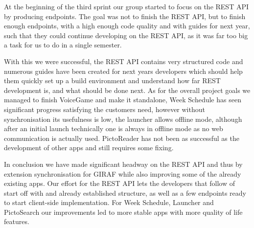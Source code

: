 \bigskip \noindent
At the beginning of the third sprint our group started to focus on the REST API by producing endpoints.
The goal was not to finish the REST API, but to finish enough endpoints, with a high enough code quality and with guides for next year, such that they could continue developing on the REST API, as it was far too big a task for us to do in a single semester.

With this we were successful, the REST API contains very structured code and numerous guides have been created for next years developers which should help them quickly set up a build environment and understand how far REST development is, and what should be done next.
As for the overall project goals we managed to finish VoiceGame and make it standalone, Week Schedule has seen significant progress satisfying the customers need, however without synchronisation its usefulness is low, the launcher allows offline mode, although after an initial launch technically one is always in offline mode as no web communication is actually used.
PictoReader has not been as successful as the development of other apps and still requires some fixing.

In conclusion we have made significant headway on the REST API and thus by extension synchronisation for GIRAF while also improving some of the already existing apps.
Our effort for the REST API lets the developers that follow of start off with and already established structure, as well as a few endpoints ready to start client-side implementation.
For Week Schedule, Launcher and PictoSearch our improvements led to more stable apps with more quality of life features.